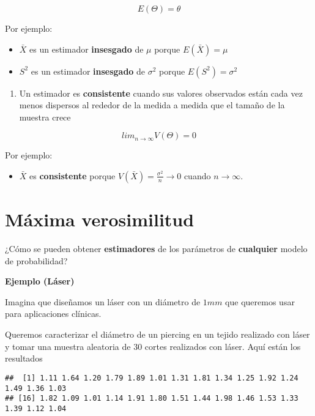 \documentclass[
]{book}
\providecommand{\tightlist}{%
  \setlength{\itemsep}{0pt}\setlength{\parskip}{0pt}}
\begin{document}
\[E(\Theta)=\theta\]

Por ejemplo:

\begin{itemize}
\item
  \(\bar{X}\) es un estimador \textbf{insesgado} de \(\mu\) porque \(E(\bar{X})=\mu\)
\item
  \(S^2\) es un estimador \textbf{insesgado} de \(\sigma^2\) porque \(E(S^2)=\sigma^2\)
\end{itemize}

\begin{enumerate}
\def\labelenumi{\arabic{enumi}.}
\setcounter{enumi}{1}
\tightlist
\item
  Un estimador es \textbf{consistente} cuando sus valores observados están cada vez menos dispersos al rededor de la medida a medida que el tamaño de la muestra crece
\end{enumerate}

\[lim_{n\rightarrow \infty} V(\Theta) = 0\]

Por ejemplo:

\begin{itemize}
\tightlist
\item
  \(\bar{X}\) es \textbf{consistente} porque \(V(\bar{X})=\frac{\sigma^2}{n}\rightarrow 0\) cuando \(n \rightarrow \infty\).
\end{itemize}

\hypertarget{muxe1xima-verosimilitud}{%
\section{Máxima verosimilitud}\label{muxe1xima-verosimilitud}}

¿Cómo se pueden obtener \textbf{estimadores} de los parámetros de \textbf{cualquier} modelo de probabilidad?

\textbf{Ejemplo (Láser)}

Imagina que diseñamos un láser con un diámetro de \(1 mm\) que queremos usar para aplicaciones clínicas.

Queremos caracterizar el diámetro de un piercing en un tejido realizado con láser y tomar una muestra aleatoria de \(30\) cortes realizados con láser. Aquí están los resultados

\begin{verbatim}
##  [1] 1.11 1.64 1.20 1.79 1.89 1.01 1.31 1.81 1.34 1.25 1.92 1.24 1.49 1.36 1.03
## [16] 1.82 1.09 1.01 1.14 1.91 1.80 1.51 1.44 1.98 1.46 1.53 1.33 1.39 1.12 1.04
\end{verbatim}
\end{document}

